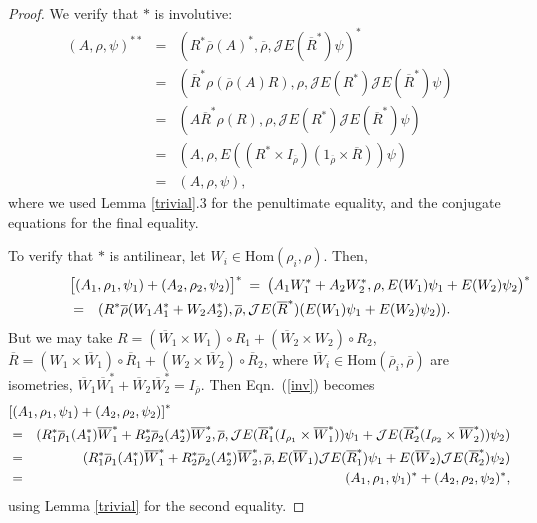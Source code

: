 \documentclass[11pt]{article}
\theoremstyle{definition}
\theoremstyle{definition}
\theoremstyle{remark}
\def\2#1{{\mathcal #1}}
\def\ol#1{{\overline #1}}
\newcommand{\Hom}{\mathrm{Hom}}
\begin{document}
\begin{proof}
We verify that $*$ is involutive:
\begin{eqnarray*}
  (A,\rho ,\psi )^{**} &=& (R^*\ol\rho (A)^*,\ol\rho ,\2JE(\ol R^*)\psi )^* \\
  &=& (\ol R^*\rho (\ol\rho (A)R),\rho,\2JE(R^*)\2JE(\ol R^*)\psi ) \\
  &=& (A\ol R^*\rho (R),\rho ,\2JE(R^*)\2JE(\ol R^*)\psi ) \\
  &=& (A,\rho ,E((R^*\times I_{\ol\rho})(1_{\ol\rho}\times \ol R))\psi ) \\
  &=& (A,\rho ,\psi ) ,
\end{eqnarray*}
where we used Lemma \ref{trivial}.3 for the penultimate equality, and the conjugate
equations for the final equality.

To verify that $*$ is antilinear, let $W_i\in \Hom (\rho _i,\rho )$.  Then,
\begin{eqnarray} \lefteqn{ \bigl[ (A_1,\rho _1,\psi _1)+(A_2,\rho _2,\psi _2)\bigr]
    ^* \:=\: \bigl(
    A_1W_1^*+A_2W_2^*,\rho ,E(W_1)\psi _1+E(W_2)\psi _2 \bigr) ^* } \nonumber \\
  &=& (R^*\ol\rho (W_1A_1^*+W_2A_2^*),\ol\rho ,\2JE(\ol R^*)(E(W_1)\psi _1+E(W_2)\psi
  _2)) .\label{inv} \end{eqnarray} But we may take $R=(\ol W_1\times W_1)\circ
R_1+(\ol W_2\times W_2)\circ R_2$, $\ol R=(W_1\times \ol W_1)\circ \ol R_1+(W_2\times
\ol W_2)\circ \ol R_2$, where $\ol W_i\in \Hom (\ol\rho _i,\ol\rho )$ are isometries,
$\ol W_1\ol W_1^*+\ol W_2\ol W_2^*=I_{\ol\rho}$.  Then Eqn.\ (\ref{inv}) becomes
\begin{eqnarray*} 
  \lefteqn{  \left[ (A_1,\rho _1,\psi _1)+(A_2,\rho _2,\psi _2)\right] ^* } \\
  &=& (R_1^*\ol\rho
  _1(A_1^*)\ol W_1^*+R_2^*\ol\rho _2(A_2^*)\ol W_2^*,\ol\rho ,\2JE(\ol R_1^*(I_{\rho _1}\times
  \ol W_1^*))\psi _1+\2JE(\ol R_2^*(I_{\rho _2}\times \ol W_2^*))\psi _2) \\
  &=& (R_1^*\ol \rho _1(A_1^*)\ol W_1^*+R_2^*\ol \rho _2(A_2^*)\ol W_2^*,\ol\rho ,E(\ol
  W_1)\2JE(\ol R_1^*)\psi _1+E(\ol W_2)\2JE(\ol R_2^*)\psi _2) \\
  &=& (A_1,\rho _1,\psi _1)^*+(A_2,\rho _2,\psi _2)^* ,\end{eqnarray*} using
Lemma \ref{trivial} for the second equality.


\end{proof}
\end{document}
